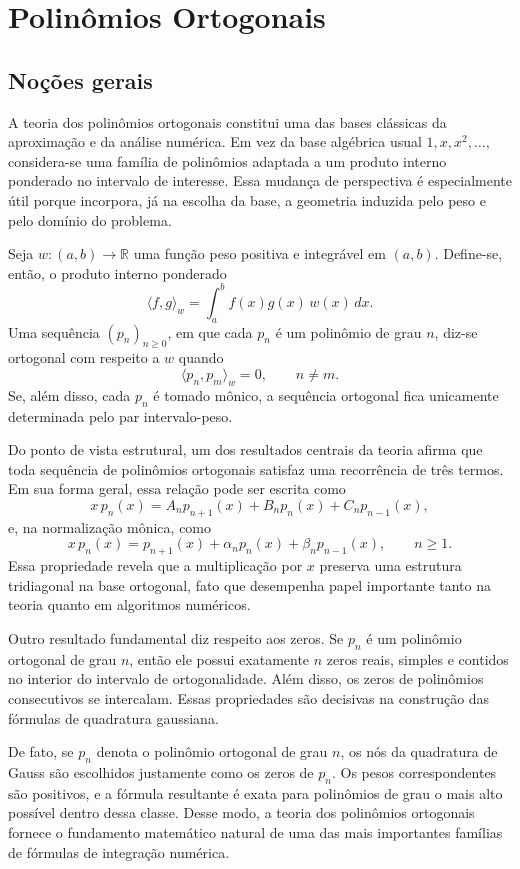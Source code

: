 \chapter{Polinômios Ortogonais}

\section{Noções gerais}

A teoria dos polinômios ortogonais constitui uma das bases clássicas da aproximação e da análise numérica. Em vez da base algébrica usual \(1,x,x^2,\dots\), considera-se uma família de polinômios adaptada a um produto interno ponderado no intervalo de interesse. Essa mudança de perspectiva é especialmente útil porque incorpora, já na escolha da base, a geometria induzida pelo peso e pelo domínio do problema.

Seja \(w:(a,b)\to \mathbb{R}\) uma função peso positiva e integrável em \((a,b)\). Define-se, então, o produto interno ponderado
\[
\langle f,g\rangle_w=\int_a^b f(x)g(x)\,w(x)\,dx.
\]
Uma sequência \((p_n)_{n\geq 0}\), em que cada \(p_n\) é um polinômio de grau \(n\), diz-se ortogonal com respeito a \(w\) quando
\[
\langle p_n,p_m\rangle_w=0,\qquad n\neq m.
\]
Se, além disso, cada \(p_n\) é tomado mônico, a sequência ortogonal fica unicamente determinada pelo par intervalo-peso.

Do ponto de vista estrutural, um dos resultados centrais da teoria afirma que toda sequência de polinômios ortogonais satisfaz uma recorrência de três termos. Em sua forma geral, essa relação pode ser escrita como
\[
x\,p_n(x)=A_n p_{n+1}(x)+B_n p_n(x)+C_n p_{n-1}(x),
\]
e, na normalização mônica, como
\[
x\,p_n(x)=p_{n+1}(x)+\alpha_n p_n(x)+\beta_n p_{n-1}(x), \qquad n\geq 1.
\]
Essa propriedade revela que a multiplicação por \(x\) preserva uma estrutura tridiagonal na base ortogonal, fato que desempenha papel importante tanto na teoria quanto em algoritmos numéricos.

Outro resultado fundamental diz respeito aos zeros. Se \(p_n\) é um polinômio ortogonal de grau \(n\), então ele possui exatamente \(n\) zeros reais, simples e contidos no interior do intervalo de ortogonalidade. Além disso, os zeros de polinômios consecutivos se intercalam. Essas propriedades são decisivas na construção das fórmulas de quadratura gaussiana.

De fato, se \(p_n\) denota o polinômio ortogonal de grau \(n\), os nós da quadratura de Gauss são escolhidos justamente como os zeros de \(p_n\). Os pesos correspondentes são positivos, e a fórmula resultante é exata para polinômios de grau o mais alto possível dentro dessa classe. Desse modo, a teoria dos polinômios ortogonais fornece o fundamento matemático natural de uma das mais importantes famílias de fórmulas de integração numérica.

